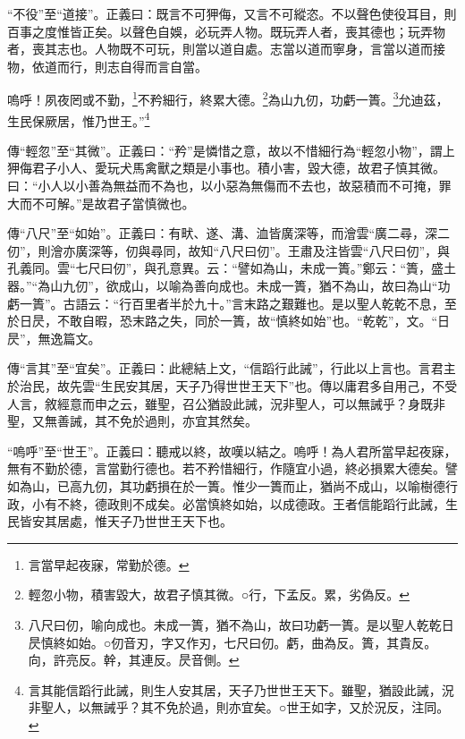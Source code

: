 {\noindent\shu{}\fzkt “不役”至“道接”。正義曰：既言不可狎侮，又言不可縱恣。不以聲色使役耳目，則百事之度惟皆正矣。以聲色自娛，必玩弄人物。既玩弄人者，喪其德也；玩弄物者，喪其志也。人物既不可玩，則當以道自處。志當以道而寧身，言當以道而接物，依道而行，則志自得而言自當。 \par}

嗚呼！夙夜罔或不勤，\footnote{言當早起夜寐，常勤於德。}不矜細行，終累大德。\footnote{輕忽小物，積害毀大，故君子慎其微。○行，下孟反。累，劣偽反。}為山九仞，功虧一簣。\footnote{八尺曰仞，喻向成也。未成一簣，猶不為山，故曰功虧一簣。是以聖人乾乾日昃慎終如始。○仞音刃，字又作刃，七尺曰仞。虧，曲為反。簣，其貴反。向，許亮反。幹，其連反。昃音側。}允迪茲，生民保厥居，惟乃世王。”\footnote{言其能信蹈行此誡，則生人安其居，天子乃世世王天下。雖聖，猶設此誡，況非聖人，以無誡乎？其不免於過，則亦宜矣。○世王如字，又於況反，注同。}


{\noindent\zhuan{}\fzbyks 傳“輕忽”至“其微”。正義曰：“矜”是憐惜之意，故以不惜細行為“輕忽小物”，謂上狎侮君子小人、愛玩犬馬禽獸之類是小事也。積小害，毀大德，故君子慎其微。曰：“小人以小善為無益而不為也，以小惡為無傷而不去也，故惡積而不可掩，罪大而不可解。”是故君子當慎微也。 \par}

{\noindent\zhuan{}\fzbyks 傳“八尺”至“如始”。正義曰：有畎、遂、溝、洫皆廣深等，而澮雲“廣二尋，深二仞”，則澮亦廣深等，仞與尋同，故知“八尺曰仞”。王肅及注皆雲“八尺曰仞”，與孔義同。雲“七尺曰仞”，與孔意異。云：“譬如為山，未成一簣。”鄭云：“簣，盛土器。”“為山九仞”，欲成山，以喻為善向成也。未成一簣，猶不為山，故曰為山“功虧一簣”。古語云：“行百里者半於九十。”言末路之艱難也。是以聖人乾乾不息，至於日昃，不敢自暇，恐末路之失，同於一簣，故“慎終如始”也。“乾乾”，文。“日昃”，無逸篇文。 \par}

{\noindent\zhuan{}\fzbyks 傳“言其”至“宜矣”。正義曰：此總結上文，“信蹈行此誡”，行此以上言也。言君主於治民，故先雲“生民安其居，天子乃得世世王天下”也。傳以庸君多自用己，不受人言，敘經意而申之云，雖聖，召公猶設此誡，況非聖人，可以無誡乎？身既非聖，又無善誡，其不免於過則，亦宜其然矣。 \par}

{\noindent\shu{}\fzkt “嗚呼”至“世王”。正義曰：聽戒以終，故嘆以結之。嗚呼！為人君所當早起夜寐，無有不勤於德，言當勤行德也。若不矜惜細行，作隨宜小過，終必損累大德矣。譬如為山，已高九仞，其功虧損在於一簣。惟少一簣而止，猶尚不成山，以喻樹德行政，小有不終，德政則不成矣。必當慎終如始，以成德政。王者信能蹈行此誡，生民皆安其居處，惟天子乃世世王天下也。 \par}

